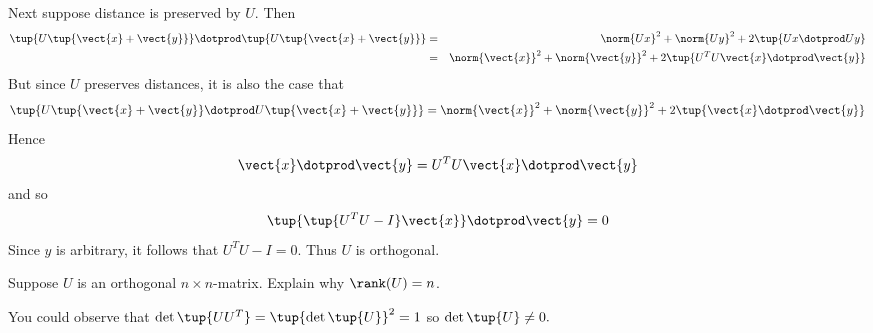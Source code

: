 \begin{enumialphparenastyle}
\begin{ex}
\begin{sol}
 Next suppose distance is
preserved by $U$. Then
\begin{eqnarray*}
\tup{U\tup{\vect{x}+\vect{y}}}  \dotprod \tup{U\tup{\vect{x}+\vect{y}
} } &=&\norm{Ux} ^{2}+\norm{Uy}
^{2}+2 \tup{Ux \dotprod Uy} \\
&=&\norm{\vect{x}} ^{2}+\norm{\vect{y}}
^{2}+2\tup{U^{T}U\vect{x} \dotprod \vect{y}}
\end{eqnarray*}
But since $U$ preserves distances, it is also the case that
\[
\tup{U\tup{\vect{x}+\vect{y}} \dotprod U\tup{\vect{x}+\vect{y}
} } =\norm{\vect{x}} ^{2}+\norm{\vect{y}
} ^{2}+2\tup{\vect{x}\dotprod \vect{y}}
\]
Hence
\[
 \vect{x} \dotprod \vect{y} = U^{T}U\vect{x} \dotprod \vect{y}
\]
and so
\[
\tup{\tup{U^{T}U-I} \vect{x}} \dotprod \vect{y} =0
\]
Since $y$ is arbitrary, it follows that $U^{T}U-I=0$. Thus $U$ is orthogonal.
\end{sol}
\end{ex}

\begin{ex} Suppose $U$ is an orthogonal $n\times n$-matrix. Explain why $\rank(U) =n$.
\begin{sol}
You could observe that $\det \tup{UU^{T}}
=\tup{\det \tup{U} } ^{2}=1$ so $\det \tup{U} \neq 0.
$
\end{sol}
\end{ex}


\end{enumialphparenastyle}
